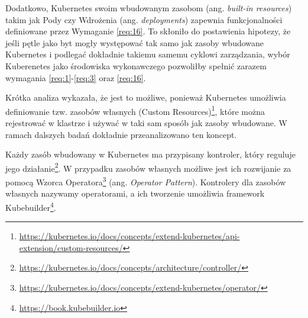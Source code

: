 Dodatkowo, Kubernetes swoim wbudowanym zasobom (ang. \textit{built-in resources}) takim jak Pody czy Wdrożenia (ang. \textit{deployments}) zapewnia funkcjonalności definiowane przez Wymaganie \ref{req:16}. To skłoniło do postawienia hipotezy, że jeśli pętle jako byt mogły występować tak samo jak zasoby wbudowane Kubernetes i podlegać dokładnie takiemu samemu cyklowi zarządzania, wybór Kuberenetes jako środowiska wykonawczego pozwoliłby spełnić zarazem wymagania \ref{req:1}-\ref{req:3} oraz \ref{req:16}. 

Krótka analiza wykazała, że jest to możliwe, ponieważ Kubernetes umożliwia definiowanie tzw. zasobów własnych (Custom Resources)\footnote{\url{https://kubernetes.io/docs/concepts/extend-kubernetes/api-extension/custom-resources/}}, które można rejestrować w klastrze i używać w taki sam sposób jak zasoby wbudowane. W ramach dalszych badań dokładnie przeanalizowano ten koncept.

Każdy zasób wbudowany w Kubernetes ma przypisany kontroler, który reguluje jego działanie\footnote{\url{https://kubernetes.io/docs/concepts/architecture/controller/}}. W przypadku zasobów własnych możliwe jest ich rozwijanie za pomocą Wzorca Operatora\footnote{\url{https://kubernetes.io/docs/concepts/extend-kubernetes/operator/}} (ang. \textit{Operator Pattern}). Kontrolery dla zasobów własnych nazywamy operatorami, a ich tworzenie umożliwia framework Kubebuilder\footnote{\url{https://book.kubebuilder.io}}.



